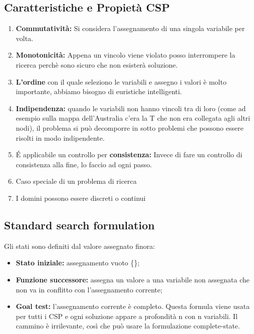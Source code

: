 \subsection{Caratteristiche e Propietà CSP}
\begin{enumerate}
    \item \textbf{Commutatività:} Si considera l’assegnamento di una singola variabile per volta.
    \item \textbf{Monotonicità:} Appena un vincolo viene violato posso interrompere la ricerca perchè sono sicuro che non esisterà soluzione.
    \item \textbf{L’ordine} con il quale seleziono le variabili e assegno i valori è molto importante, abbiamo bisogno di euristiche intelligenti.
    \item \textbf{Indipendenza:} quando le variabili non hanno vincoli tra di loro (come ad esempio sulla mappa dell’Australia c’era la T che non era collegata agli altri nodi), il problema si può decomporre in sotto problemi che possono essere risolti in modo indipendente.
    \item É applicabile un controllo per \textbf{consistenza:} Invece di fare un controllo di consistenza alla fine, lo faccio ad ogni passo.
    \item Caso speciale di un problema di ricerca
    \item I domini possono essere discreti o continui
\end{enumerate}
\subsection{Standard search formulation}
Gli stati sono definiti dal valore assegnato finora:
\begin{itemize}
    \item \textbf{Stato iniziale: }assegnamento vuoto \{\};
    \item \textbf{Funzione successore: }assegna un valore a una variabile non assegnata che non va in conflitto con l’assegnamento corrente;
    \item \textbf{Goal test: }l’assegnamento corrente è completo. Questa formula viene usata per tutti i CSP e ogni soluzione appare a profondità n con n variabili. Il cammino è irrilevante, così che può usare la formulazione complete-state.
\end{itemize}

